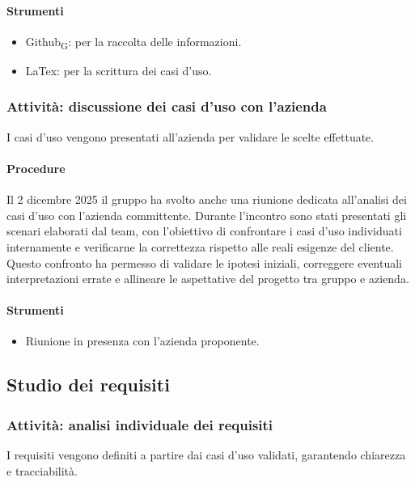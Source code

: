 \documentclass[11pt,a4paper]{article}
\newcommand{\gls}[1]{#1\textsubscript{G}}
\begin{document}
\paragraph{Strumenti}
\begin{itemize}
\item \gls{Github}: per la raccolta delle informazioni.
\item LaTex: per la scrittura dei casi d'uso.
\end{itemize}

\subsubsection{Attività: discussione dei casi d’uso con l’azienda}
I casi d’uso vengono presentati all’azienda per validare le scelte effettuate.

\paragraph{Procedure}
Il 2 dicembre 2025 il gruppo ha svolto anche una riunione dedicata all'analisi dei casi d'uso con l’azienda committente. Durante l’incontro sono stati presentati gli scenari elaborati dal team, con l’obiettivo di confrontare i casi d’uso individuati internamente e verificarne la correttezza rispetto alle reali esigenze del cliente. Questo confronto ha permesso di validare le ipotesi iniziali, correggere eventuali interpretazioni errate e allineare le aspettative del progetto tra gruppo e azienda.

\paragraph{Strumenti}
\begin{itemize}
\item Riunione in presenza con l'azienda proponente.
\end{itemize}

\subsection{Studio dei requisiti}

\subsubsection{Attività: analisi individuale dei requisiti}
I requisiti vengono definiti a partire dai casi d’uso validati, garantendo chiarezza e tracciabilità.
\end{document}
